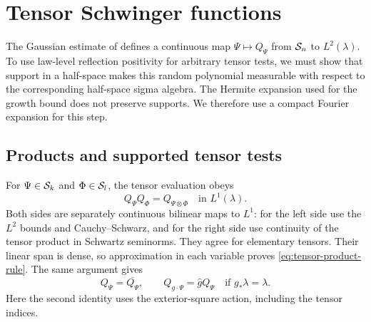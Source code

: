 \section{Tensor Schwinger functions}\label{sec:tensor-axioms}

The Gaussian estimate of \cite[Proposition~6.1]{ContinuumLimits} defines a continuous map
$\Psi\mapsto Q_\Psi$ from $\mathcal S_n$ to $L^2(\lambda)$.
To use law-level reflection positivity for arbitrary tensor tests,
we must show that support in a half-space makes this random polynomial
measurable with respect to the corresponding half-space sigma algebra. The Hermite
expansion used for the growth bound does not preserve supports.
We therefore use a compact Fourier expansion for this step.

\subsection{Products and supported tensor tests}

For $\Psi\in\mathcal S_k$ and $\Phi\in\mathcal S_l$, the tensor evaluation
obeys
\begin{equation}\label{eq:tensor-product-rule}
 Q_\Psi Q_\Phi=Q_{\Psi\otimes\Phi}\quad\text{in }L^1(\lambda).
\end{equation}
Both sides are separately continuous bilinear maps to $L^1$:
for the left side use the $L^2$ bounds and Cauchy--Schwarz, and for
the right side use continuity of the tensor product in Schwartz
seminorms. They agree for elementary tensors. Their linear span
is dense, so approximation in each variable proves
\eqref{eq:tensor-product-rule}. The same argument gives
\begin{equation}\label{eq:tensor-equivariance}
 Q_{\overline\Psi}=\overline{Q_\Psi},\qquad
 Q_{g\cdot\Psi}=\widehat g Q_\Psi
 \quad\text{if }g_*\lambda=\lambda.
\end{equation}
Here the second identity uses the exterior-square action, including
the tensor indices.

